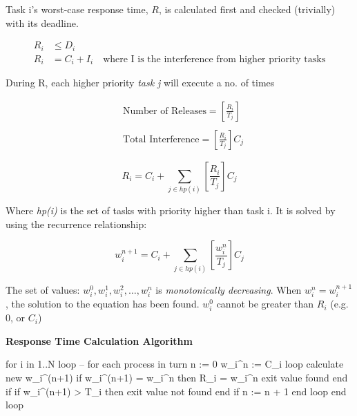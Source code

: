 \documentclass[a4paper,11pt]{article}
\begin{document}
\Needspace{75pt}

Task i's worst-case response time, $R$, is calculated first and checked (trivially) with its deadline.\par

\[
\begin{aligned}
R_{i} &\leq D_{i} \\
R_{i} &= C_{i} + I_{i} \quad \text{where I is the interference from higher priority tasks}
\end{aligned}
\]

During R, each higher priority \emph{task j} will execute a no. of times\par

\[
\begin{aligned}
&\text{Number of Releases} = \left[ \frac{R_{i}}{T_{j}}\right] \\ \\
&\text{Total Interference} = \left[ \frac{R_{i}}{T_{j}} \right] C_{j}
\end{aligned}
\]

\Needspace{100pt}

\[
R_{i} = C_{i} + \sum_{j\in hp(i)}\left[ \frac{R_{i}}{T_{j}} \right]C_{j}
\]

Where \emph{hp(i)} is the set of tasks with priority higher than task i. It is solved by using the recurrence relationship:\par

\[
w_{i}^{n+1} = C_{i} + \sum_{j\in hp(i)}\left[ \frac{w_{i}^n}{T_{j}} \right]C_{j}
\]

The set of values: $w^0_{i}, w^1_{i}, w^2_{i}, \dots, w^n_{i}$ is \emph{monotonically decreasing}. When $w_i^n = w_i^{n+1}$, the solution to the equation has been found. $w_i^0$ cannot be greater than $R_i$ (e.g. 0, or $C_i$)\par

\textbf{Response Time Calculation Algorithm}\par

\begin{minipage}{\linewidth}
\begin{notecode}[language={},basicstyle=\fontsize{9.5}{11}\selectfont\ttfamily\color{NoteInk}]
for i in 1..N loop -- for each process in turn
    n := 0
    w_i^n := C_i
    loop
        calculate new w_i^(n+1)
        if w_i^(n+1) = w_i^n then
            R_i = w_i^n
            exit value found
        end if
        if w_i^(n+1) > T_i then
            exit value not found
        end if
        n := n + 1
    end loop
end loop
\end{notecode}
\end{minipage}
\end{document}
